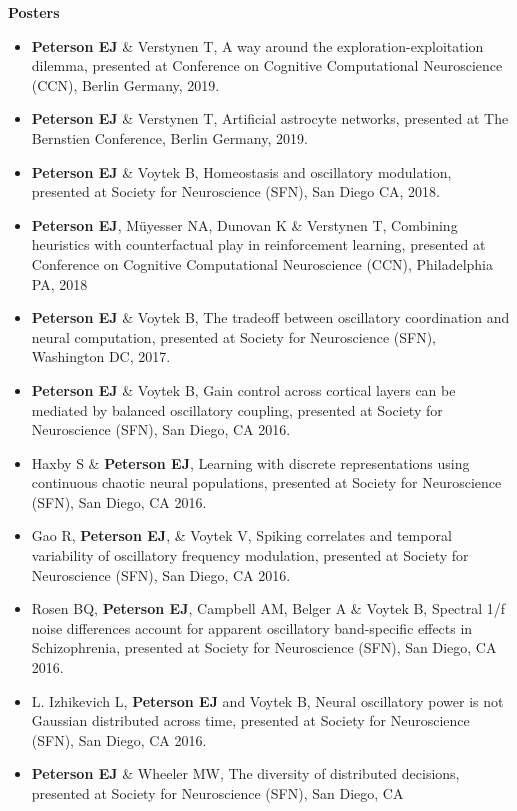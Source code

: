 \textbf{Posters}

\begin{itemize}
\item
  \textbf{Peterson EJ} \& Verstynen T, A way around the
  exploration-exploitation dilemma, presented at Conference on Cognitive
  Computational Neuroscience (CCN), Berlin Germany, 2019.
\item
  \textbf{Peterson EJ} \& Verstynen T, Artificial astrocyte networks,
  presented at The Bernstien Conference, Berlin Germany, 2019.
\item
  \textbf{Peterson EJ} \& Voytek B, Homeostasis and oscillatory
  modulation, presented at Society for Neuroscience (SFN), San Diego CA,
  2018.
\item
  \textbf{Peterson EJ}, Müyesser NA, Dunovan K \& Verstynen T, Combining
  heuristics with counterfactual play in reinforcement learning,
  presented at Conference on Cognitive Computational Neuroscience (CCN),
  Philadelphia PA, 2018
\item
  \textbf{Peterson EJ} \& Voytek B, The tradeoff between oscillatory
  coordination and neural computation, presented at Society for
  Neuroscience (SFN), Washington DC, 2017.
\item
  \textbf{Peterson EJ} \& Voytek B, Gain control across cortical layers
  can be mediated by balanced oscillatory coupling, presented at Society
  for Neuroscience (SFN), San Diego, CA 2016.
\item
  Haxby S \& \textbf{Peterson EJ}, Learning with discrete
  representations using continuous chaotic neural populations, presented
  at Society for Neuroscience (SFN), San Diego, CA 2016.
\item
  Gao R, \textbf{Peterson EJ}, \& Voytek V, Spiking correlates and
  temporal variability of oscillatory frequency modulation, presented at
  Society for Neuroscience (SFN), San Diego, CA 2016.
\item
  Rosen BQ, \textbf{Peterson EJ}, Campbell AM, Belger A \& Voytek B,
  Spectral 1/f noise differences account for apparent oscillatory
  band-specific effects in Schizophrenia, presented at Society for
  Neuroscience (SFN), San Diego, CA 2016.
\item
  L. Izhikevich L, \textbf{Peterson EJ} and Voytek B, Neural oscillatory
  power is not Gaussian distributed across time, presented at Society
  for Neuroscience (SFN), San Diego, CA 2016.
\item
  \textbf{Peterson EJ} \& Wheeler MW, The diversity of distributed
  decisions, presented at Society for Neuroscience (SFN), San Diego, CA

\end{itemize}
